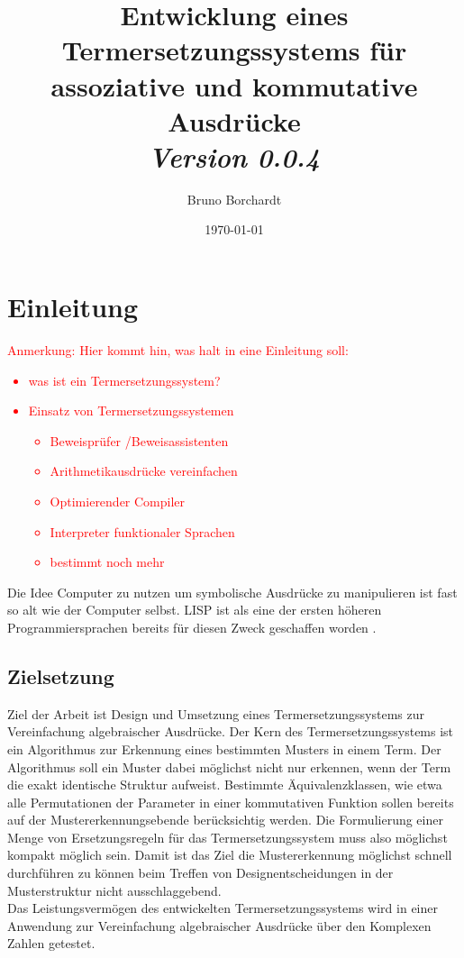\documentclass{scrartcl}
\title{Entwicklung eines Termersetzungssystems für assoziative und kommutative Ausdrücke\\ \textit{Version 0.0.4}}
\author{Bruno Borchardt}
\date{\today}
\numberwithin{figure}{section} %
\theoremstyle{definition} %
\begin{document}
\maketitle

\tableofcontents

\clearpage

\section{Einleitung} \label{secEinleitung}
\textcolor{red} {
\begin{itshape}
Anmerkung: Hier kommt hin, was halt in eine Einleitung soll:
\begin{itemize}
    \item was ist ein Termersetzungssystem?
    \item Einsatz von Termersetzungssystemen
    \begin{itemize}
        \item Beweisprüfer /Beweisassistenten
        \item Arithmetikausdrücke vereinfachen
        \item Optimierender Compiler
        \item Interpreter funktionaler Sprachen
        \item bestimmt noch mehr
    \end{itemize}
\end{itemize}
\end{itshape}
}

Die Idee Computer zu nutzen um symbolische Ausdrücke zu manipulieren ist fast so alt wie der Computer selbst.  LISP ist als eine der ersten höheren Programmiersprachen bereits für diesen Zweck geschaffen worden \cite{lisp}. 

\subsection{Zielsetzung}
Ziel der Arbeit ist Design und Umsetzung eines Termersetzungssystems zur Vereinfachung algebraischer Ausdrücke. Der Kern des Termersetzungssystems ist ein Algorithmus zur Erkennung eines bestimmten Musters in einem Term. 
Der Algorithmus soll ein Muster dabei möglichst nicht nur erkennen, wenn der Term die exakt identische Struktur aufweist. Bestimmte Äquivalenzklassen, wie etwa alle Permutationen der Parameter in einer kommutativen Funktion sollen bereits auf der Mustererkennungsebende berücksichtig werden. Die Formulierung einer Menge von Ersetzungsregeln für das Termersetzungssystem muss also möglichst kompakt möglich sein. 
Damit ist das Ziel die Mustererkennung möglichst schnell durchführen zu können beim Treffen von Designentscheidungen in der Musterstruktur nicht ausschlaggebend. \\
Das Leistungsvermögen des entwickelten Termersetzungssystems wird in einer Anwendung zur Vereinfachung algebraischer Ausdrücke über den Komplexen Zahlen getestet. 
\end{document}
